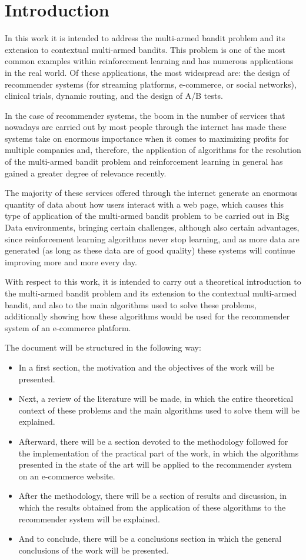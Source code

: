 \documentclass[../main.tex]{subfiles}
\begin{document}
\chapter{Introduction}\label{ch:introduction}

In this work it is intended to address the multi-armed bandit problem and its
extension to contextual multi-armed bandits. This problem is one of the most common
examples within reinforcement learning and has numerous applications in the
real world. Of these applications, the most widespread are: the design of
recommender systems (for streaming platforms, e-commerce, or social
networks), clinical trials, dynamic routing, and the design of A/B tests.  

In the case of recommender systems, the boom in the number of services that
nowadays are carried out by most people through the internet has made these systems
take on enormous importance when it comes to maximizing profits for multiple companies
and, therefore, the application of algorithms for the resolution of the multi-armed
bandit problem and reinforcement learning in general has gained a greater degree of
relevance recently.  

The majority of these services offered through the internet generate an enormous
quantity of data about how users interact with a web page, which causes this type of
application of the multi-armed bandit problem to be carried out in Big Data
environments, bringing certain challenges, although also certain advantages, since
reinforcement learning algorithms never stop learning, and as more data are generated
(as long as these data are of good quality) these systems will continue improving more
and more every day.  

With respect to this work, it is intended to carry out a theoretical introduction to
the multi-armed bandit problem and its extension to the contextual multi-armed bandit,
and also to the main algorithms used to solve these problems, additionally showing how
these algorithms would be used for the recommender system of an e-commerce
platform.  

The document will be structured in the following way:
\begin{itemize}
\item In a first section, the motivation and the objectives of the work will be
presented.
\item Next, a review of the literature will be made, in which the entire theoretical
context of these problems and the main algorithms used to solve them will be
explained.
\item Afterward, there will be a section devoted to the methodology followed for the
implementation of the practical part of the work, in which the algorithms presented in
the state of the art will be applied to the recommender system on an e-commerce
website.
\item After the methodology, there will be a section of results and discussion, in
which the results obtained from the application of these algorithms to the
recommender system will be explained.
\item And to conclude, there will be a conclusions section in which the general
conclusions of the work will be presented.
\end{itemize}
\end{document}
